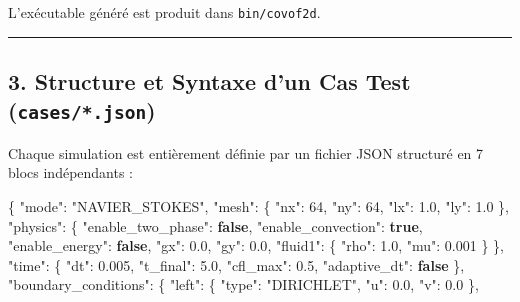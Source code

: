 \documentclass[
  french,
]{article}
\newenvironment{Shaded}{}{}
\newcommand{\DataTypeTok}[1]{\textcolor[rgb]{0.56,0.13,0.00}{#1}}
\newcommand{\DecValTok}[1]{\textcolor[rgb]{0.25,0.63,0.44}{#1}}
\newcommand{\FloatTok}[1]{\textcolor[rgb]{0.25,0.63,0.44}{#1}}
\newcommand{\FunctionTok}[1]{\textcolor[rgb]{0.02,0.16,0.49}{#1}}
\newcommand{\KeywordTok}[1]{\textcolor[rgb]{0.00,0.44,0.13}{\textbf{#1}}}
\newcommand{\StringTok}[1]{\textcolor[rgb]{0.25,0.44,0.63}{#1}}
\begin{document}
L'exécutable généré est produit dans \texttt{bin/covof2d}.

\begin{center}\rule{0.5\linewidth}{0.5pt}\end{center}

\subsection{\texorpdfstring{3. Structure et Syntaxe d'un Cas Test
(\texttt{cases/*.json})}{3. Structure et Syntaxe d'un Cas Test (cases/*.json)}}\label{structure-et-syntaxe-dun-cas-test-cases.json}

Chaque simulation est entièrement définie par un fichier JSON structuré
en 7 blocs indépendants :

\begin{Shaded}
\begin{Highlighting}[]
\FunctionTok{\{}
  \DataTypeTok{"mode"}\FunctionTok{:} \StringTok{"NAVIER\_STOKES"}\FunctionTok{,}
  \DataTypeTok{"mesh"}\FunctionTok{:} \FunctionTok{\{}
    \DataTypeTok{"nx"}\FunctionTok{:} \DecValTok{64}\FunctionTok{,}
    \DataTypeTok{"ny"}\FunctionTok{:} \DecValTok{64}\FunctionTok{,}
    \DataTypeTok{"lx"}\FunctionTok{:} \FloatTok{1.0}\FunctionTok{,}
    \DataTypeTok{"ly"}\FunctionTok{:} \FloatTok{1.0}
  \FunctionTok{\},}
  \DataTypeTok{"physics"}\FunctionTok{:} \FunctionTok{\{}
    \DataTypeTok{"enable\_two\_phase"}\FunctionTok{:} \KeywordTok{false}\FunctionTok{,}
    \DataTypeTok{"enable\_convection"}\FunctionTok{:} \KeywordTok{true}\FunctionTok{,}
    \DataTypeTok{"enable\_energy"}\FunctionTok{:} \KeywordTok{false}\FunctionTok{,}
    \DataTypeTok{"gx"}\FunctionTok{:} \FloatTok{0.0}\FunctionTok{,}
    \DataTypeTok{"gy"}\FunctionTok{:} \FloatTok{0.0}\FunctionTok{,}
    \DataTypeTok{"fluid1"}\FunctionTok{:} \FunctionTok{\{} \DataTypeTok{"rho"}\FunctionTok{:} \FloatTok{1.0}\FunctionTok{,} \DataTypeTok{"mu"}\FunctionTok{:} \FloatTok{0.001} \FunctionTok{\}}
  \FunctionTok{\},}
  \DataTypeTok{"time"}\FunctionTok{:} \FunctionTok{\{}
    \DataTypeTok{"dt"}\FunctionTok{:} \FloatTok{0.005}\FunctionTok{,}
    \DataTypeTok{"t\_final"}\FunctionTok{:} \FloatTok{5.0}\FunctionTok{,}
    \DataTypeTok{"cfl\_max"}\FunctionTok{:} \FloatTok{0.5}\FunctionTok{,}
    \DataTypeTok{"adaptive\_dt"}\FunctionTok{:} \KeywordTok{false}
  \FunctionTok{\},}
  \DataTypeTok{"boundary\_conditions"}\FunctionTok{:} \FunctionTok{\{}
    \DataTypeTok{"left"}\FunctionTok{:}   \FunctionTok{\{} \DataTypeTok{"type"}\FunctionTok{:} \StringTok{"DIRICHLET"}\FunctionTok{,} \DataTypeTok{"u"}\FunctionTok{:} \FloatTok{0.0}\FunctionTok{,} \DataTypeTok{"v"}\FunctionTok{:} \FloatTok{0.0} \FunctionTok{\},}

\end{Highlighting}
\end{Shaded}
\end{document}
